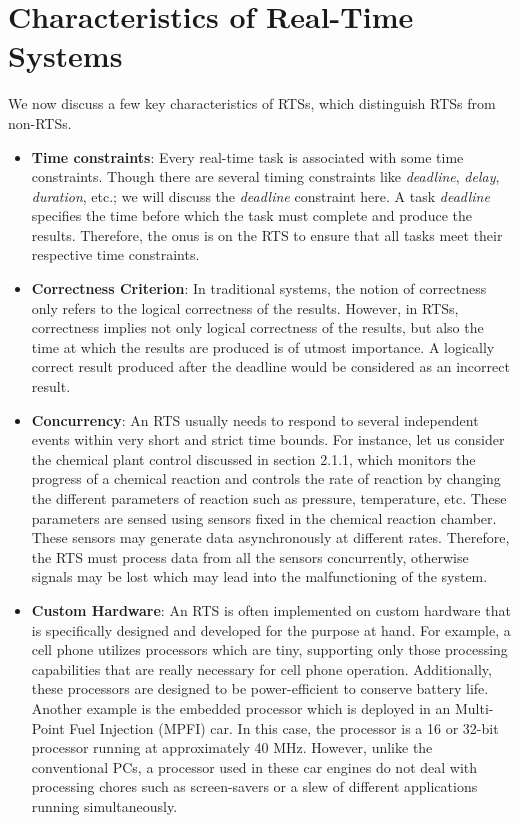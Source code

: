 \documentclass[12pt]{report}
\begin{document}
\section{Characteristics of Real-Time Systems}
We now discuss a few key characteristics of RTSs, which distinguish RTSs from non-RTSs. 
\begin{itemize}
    \item \textbf{Time constraints}: Every real-time task is associated with some time constraints. Though there are several timing constraints like \emph{deadline}, \emph{delay}, \emph{duration}, etc.; we will discuss the \emph{deadline} constraint here. A task \emph{deadline} specifies the time before which the task must complete and produce the results. Therefore, the onus is on the RTS to ensure that all tasks meet their respective time constraints. 
    \item \textbf{Correctness Criterion}: In traditional systems, the notion of correctness only refers to the logical correctness of the results. However, in RTSs, correctness implies not only logical correctness of the results, but also the time at which the results are produced is of utmost importance. A logically correct result produced after the deadline would be considered as an incorrect result. 
    \item \textbf{Concurrency}: An RTS usually needs to respond to several independent events within very short and strict time bounds. For instance, let us consider the chemical plant control discussed in section 2.1.1, which monitors the progress of a chemical reaction and controls the rate of reaction by changing the different parameters of reaction such as pressure, temperature, etc. These parameters are sensed using sensors fixed in the chemical reaction chamber. These sensors may generate data asynchronously at different rates. Therefore, the RTS must process data from all the sensors concurrently, otherwise signals may be lost which may lead into the malfunctioning of the system.
    \item \textbf{Custom Hardware}: An RTS is often implemented on custom hardware that is specifically designed and developed for the purpose at hand. For example, a cell phone utilizes processors which are tiny, supporting only those processing capabilities that are really necessary for cell phone operation. Additionally, these processors are designed to be power-efficient to conserve battery life. Another example is the embedded processor which is deployed in an Multi-Point Fuel Injection (MPFI) car. In this case, the processor is a 16 or 32-bit processor running at approximately 40 MHz. However, unlike the conventional PCs, a processor used in these car engines do not deal with processing chores such as screen-savers or a slew of different applications running simultaneously.

\end{itemize}
\end{document}
